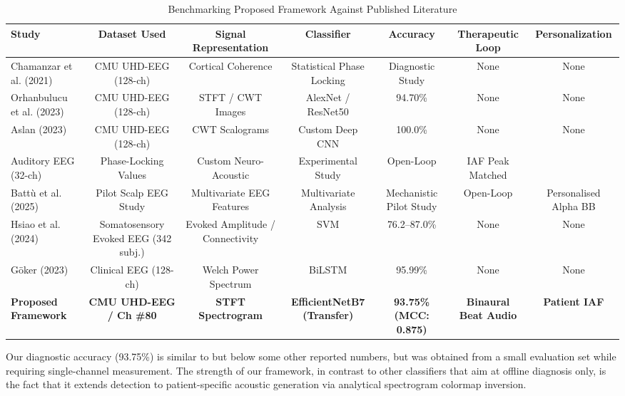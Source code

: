 \documentclass[12pt, a4paper]{report}
\begin{document}
\begin{table}[htbp]
\centering
\caption{Benchmarking Proposed Framework Against Published Literature}
\label{tab:literature_benchmarks}
\begin{adjustbox}{width=0.98\textwidth}
\begin{tabular}{lcccccc}
\toprule
\textbf{Study} & \textbf{Dataset Used} & \textbf{Signal Representation} & \textbf{Classifier} & \textbf{Accuracy} & \textbf{Therapeutic Loop} & \textbf{Personalization} \\
\midrule
Chamanzar et al. (2021) \cite{chamanzar2021uhd} & CMU UHD-EEG (128-ch) & Cortical Coherence & Statistical Phase Locking & Diagnostic Study & None & None \\
Orhanbulucu et al. (2023) \cite{orhanbulucu2023hybrid} & CMU UHD-EEG (128-ch) & STFT / CWT Images & AlexNet / ResNet50 & 94.70\% & None & None \\
Aslan (2023) \cite{aslan2023migrainecnn} & CMU UHD-EEG (128-ch) & CWT Scalograms & Custom Deep CNN & 100.0\% & None & None \\
Auditory EEG (32-ch) & Phase-Locking Values & Custom Neuro-Acoustic & Experimental Study & Open-Loop & IAF Peak Matched \\
Batt\`u et al. (2025) \cite{battu2025longterm} & Pilot Scalp EEG Study & Multivariate EEG Features & Multivariate Analysis & Mechanistic Pilot Study & Open-Loop & Personalised Alpha BB \\
Hsiao et al. (2024) \cite{hsiao2024brainstem} & Somatosensory Evoked EEG (342 subj.) & Evoked Amplitude / Connectivity & SVM & 76.2--87.0\% & None & None \\
G\"oker (2023) \cite{Goker2023} & Clinical EEG (128-ch) & Welch Power Spectrum & BiLSTM & 95.99\% & None & None \\
\textbf{Proposed Framework} & \textbf{CMU UHD-EEG / Ch \#80} & \textbf{STFT Spectrogram} & \textbf{EfficientNetB7 (Transfer)} & \textbf{93.75\% (MCC: 0.875)} & \textbf{Binaural Beat Audio} & \textbf{Patient IAF} \\
\bottomrule
\end{tabular}
\end{adjustbox}
\end{table}

Our diagnostic accuracy (93.75\%) is similar to but below some other reported numbers, but was obtained from a small evaluation set while requiring single-channel measurement. The strength of our framework, in contrast to other classifiers that aim at offline diagnosis only, is the fact that it extends detection to patient-specific acoustic generation via analytical spectrogram colormap inversion.
\end{document}
